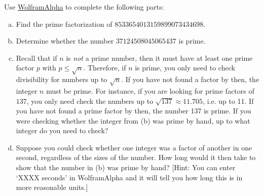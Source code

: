 \documentclass[11pt,letterpaper]{article}
\begin{document}
\vfill
\newpage



 Use \href{https://www.wolframalpha.com/}{WolframAlpha} to complete the following parts: 
\begin{enumerate}[(a)]
\item Find the prime factorization of $8533654013159899073434698$. \vfill
\item Determine whether the number $37124508045065437$ is prime. \vfill
\item Recall that if $n$ is \textit{not} a prime number, then it must have at least one prime factor $p$ with $p \leq \sqrt{n}$. Therefore, if $n$ is prime, you only need to check divisibility for numbers up to $\sqrt{n}$. If you have not found a factor by then, the integer $n$ must be prime. For instance, if you are looking for prime factors of $137$, you only need check the numbers up to $\sqrt{137} \approx 11.705$, i.e. up to 11. If you have not found a prime factor by then, the number 137 is prime. If you were checking whether the integer from (b) was prime by hand, up to what integer do you need to check? \vfill
\item  Suppose you could check whether one integer was a factor of another in one second, regardless of the sizes of the number. How long would it then take to show that the number in (b) was prime by hand? [Hint: You can enter `XXXX seconds' in WolframAlpha and it will tell you how long this is in more reasonable units.]
\end{enumerate} \vfill



\end{document}
